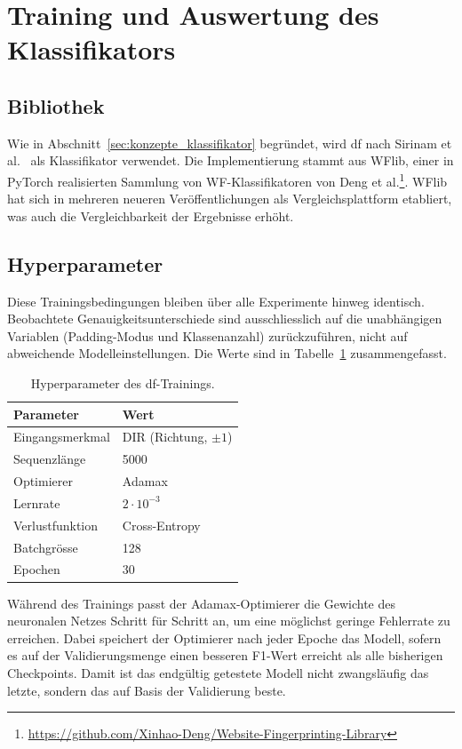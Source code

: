 \section{Training und Auswertung des Klassifikators}
\label{sec:realisierung_training}

\subsection{Bibliothek}

Wie in Abschnitt~\ref{sec:konzepte_klassifikator} begründet, wird \gls{df} nach Sirinam et al.~\cite{sirinam2018deep} als Klassifikator verwendet.
Die Implementierung stammt aus WFlib, einer in PyTorch realisierten Sammlung von WF-Klassifikatoren von Deng et al.\footnote{\url{https://github.com/Xinhao-Deng/Website-Fingerprinting-Library}}.
WFlib hat sich in mehreren neueren Veröffentlichungen als Vergleichsplattform etabliert, was auch die Vergleichbarkeit der Ergebnisse erhöht.

\subsection{Hyperparameter}

Diese Trainingsbedingungen bleiben über alle Experimente hinweg identisch.
Beobachtete Genauigkeitsunterschiede sind ausschliesslich auf die unabhängigen Variablen (Padding-Modus und Klassenanzahl) zurückzuführen, nicht auf abweichende Modelleinstellungen.
Die Werte sind in Tabelle~\ref{tab:hyperparameter} zusammengefasst.

\begin{table}[H]
\centering
\caption{Hyperparameter des \gls{df}-Trainings.}
\label{tab:hyperparameter}
\begin{tabular}{ll}
\hline
Parameter & Wert \\
\hline
Eingangsmerkmal & DIR (Richtung, $\pm 1$) \\
Sequenzlänge & 5000 \\
Optimierer & Adamax \\
Lernrate & $2\cdot 10^{-3}$ \\
Verlustfunktion & Cross-Entropy \\
Batchgrösse & 128 \\
Epochen & 30 \\
\hline
\end{tabular}
\end{table}

Während des Trainings passt der Adamax-Optimierer die Gewichte des neuronalen Netzes Schritt für Schritt an, um eine möglichst geringe Fehlerrate zu erreichen.
Dabei speichert der Optimierer nach jeder Epoche das Modell, sofern es auf der Validierungsmenge einen besseren F1-Wert erreicht als alle bisherigen Checkpoints.
Damit ist das endgültig getestete Modell nicht zwangsläufig das letzte, sondern das auf Basis der Validierung beste.

